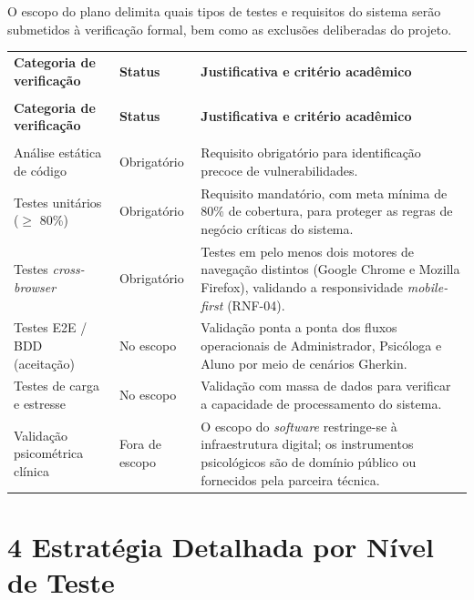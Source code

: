 \begin{apendicesenv}
O escopo do plano delimita quais tipos de testes e requisitos do sistema serão submetidos à verificação formal, bem como as exclusões deliberadas do projeto.

{\ABNTEXfontereduzida
\renewcommand{\arraystretch}{1.25}
\begin{xltabular}{\textwidth}{|>{\raggedright\arraybackslash}p{4.0cm}|>{\raggedright\arraybackslash}p{2.4cm}|>{\raggedright\arraybackslash}X|}
 \\[0.3em]
\hline
\textbf{Categoria de verificação} & \textbf{Status} & \textbf{Justificativa e critério acadêmico} \\
\hline
\endfirsthead
{} \\
\hline
\textbf{Categoria de verificação} & \textbf{Status} & \textbf{Justificativa e critério acadêmico} \\
\hline
\endhead
{} \\
\endfoot
\endlastfoot
Análise estática de código & Obrigatório & Requisito obrigatório para identificação precoce de vulnerabilidades. \\
\hline
Testes unitários ($\geq$ 80\%) & Obrigatório & Requisito mandatório, com meta mínima de 80\% de cobertura, para proteger as regras de negócio críticas do sistema. \\
\hline
Testes \textit{cross-browser} & Obrigatório & Testes em pelo menos dois motores de navegação distintos (Google Chrome e Mozilla Firefox), validando a responsividade \textit{mobile-first} (RNF-04). \\
\hline
Testes E2E / BDD (aceitação) & No escopo & Validação ponta a ponta dos fluxos operacionais de Administrador, Psicóloga e Aluno por meio de cenários Gherkin. \\
\hline
Testes de carga e estresse & No escopo & Validação com massa de dados para verificar a capacidade de processamento do sistema. \\
\hline
Validação psicométrica clínica & Fora de escopo & O escopo do \textit{software} restringe-se à infraestrutura digital; os instrumentos psicológicos são de domínio público ou fornecidos pela parceira técnica. \\
\hline
\end{xltabular}
}

\section*{4 Estratégia Detalhada por Nível de Teste}


\end{apendicesenv}
